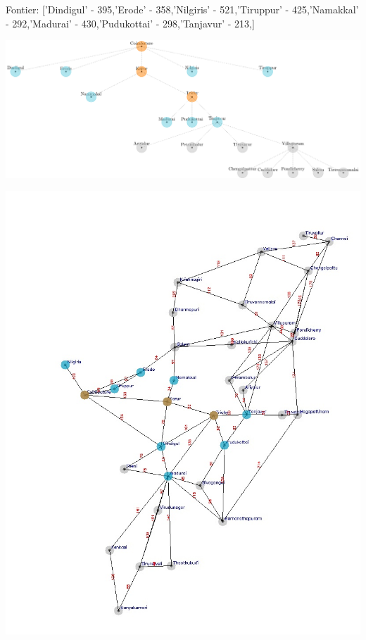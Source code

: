 \documentclass[xcolor=table]{beamer}
\begin{document}
\begin{frame}
  { \tiny Fontier: ['Dindigul' - 395,'Erode' - 358,'Nilgiris' - 521,'Tiruppur' - 425,'Namakkal' - 292,'Madurai' - 430,'Pudukottai' - 298,'Tanjavur' - 213,]}
  \begin{center}
  \includegraphics[height=0.35\textheight]{../GreedyNode/5-1.png}
  \end{center}
  \begin{center}
    \includegraphics[height=0.55\textheight]{../Greedyoutput/tamilGreedy3.jpg}
  \end{center}
\end{frame}
\end{document}
